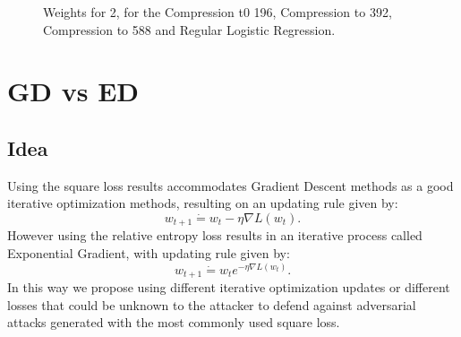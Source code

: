 \documentclass{asaproc}
\begin{document}
\begin{figure}[h!]
	\centering
	\caption{\enspace Weights for 2, for the Compression t0 196, Compression to 392, Compression to 588 and Regular Logistic Regression.}
	\label{fig5} 
\end{figure}

\section*{GD vs ED}

\subsection*{Idea}

Using the square loss results accommodates Gradient Descent methods as a good iterative optimization methods, resulting on an updating rule given by:
$$ w_{t+1} \dot{=} w_t - \eta \nabla L(w_t). $$
However using the relative entropy loss results in an iterative process called Exponential Gradient, with updating rule given by:
$$ w_{t+1} \dot{=} w_t e^{-\eta \nabla L(w_t)}. $$
In this way we propose using different iterative optimization updates or different losses that could be unknown to the attacker to defend against adversarial attacks generated with the most commonly used square loss.
\end{document}

